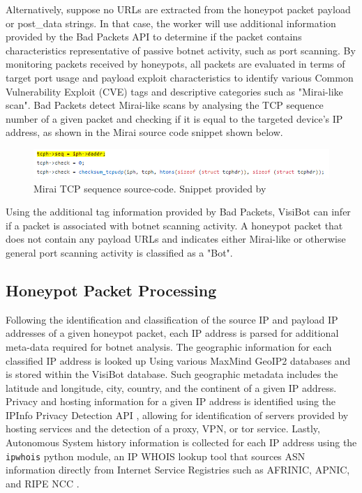 Alternatively, suppose no URLs are extracted from the honeypot packet payload or post\_data strings. In that case, the worker will use additional information provided by the Bad Packets API to determine if the packet contains characteristics representative of passive botnet activity, such as port scanning. By monitoring packets received by honeypots, all packets are evaluated in terms of target port usage and payload exploit characteristics to identify various Common Vulnerability Exploit (CVE) tags and descriptive categories such as "Mirai-like scan". Bad Packets detect Mirai-like scans by analysing the TCP sequence number of a given packet and checking if it is equal to the targeted device's IP address, as shown in the Mirai source code snippet shown below. \citep{BadPacketsMirai}

\begin{figure}[!htb]
    \centering
    \includegraphics[width=0.75\linewidth]{images/mirai-like-signature.png}
    \caption{Mirai TCP sequence source-code. Snippet provided by \citet{BadPackets}}
    \label{fig:mirai_like_scan} 
\end{figure}

Using the additional tag information provided by Bad Packets, VisiBot can infer if a packet is associated with botnet scanning activity. A honeypot packet that does not contain any payload URLs and indicates either Mirai-like or otherwise general port scanning activity is classified as a "Bot".  

\subsection{Honeypot Packet Processing}

Following the identification and classification of the source IP and payload IP addresses of a given honeypot packet, each IP address is parsed for additional meta-data required for botnet analysis. The geographic information for each classified IP address is looked up Using various MaxMind GeoIP2 databases \citep{MaxMind} and is stored within the VisiBot database. Such geographic metadata includes the latitude and longitude, city, country, and the continent of a given IP address. Privacy and hosting information for a given IP address is identified using the IPInfo Privacy Detection API \citep{IPInfo}, allowing for identification of servers provided by hosting services and the detection of a proxy, VPN, or tor service. Lastly, Autonomous System history information is collected for each IP address using the \texttt{ipwhois} python module, an IP WHOIS lookup tool that sources ASN information directly from Internet Service Registries such as AFRINIC, APNIC, and RIPE NCC \citep{Afrinic, Apnic, RipeNCC}.

